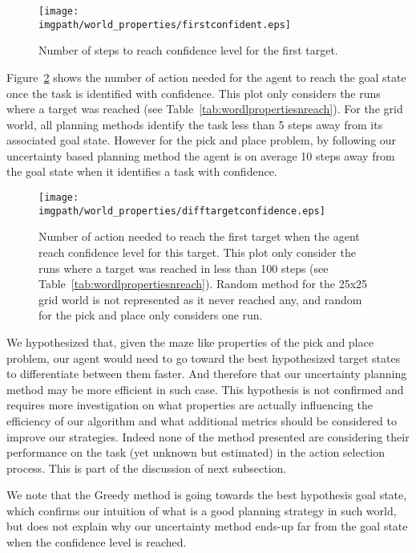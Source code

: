 \begin{figure}[!htbp]
\centering
\texttt{[image: \\imgpath/world\_properties/firstconfident.eps]}
\caption{Number of steps to reach confidence level for the first target.}
\label{fig:wordlpropertiesconfidencefirst}
\end{figure} 

Figure~\ref{fig:wordlpropertiestargetdist} shows the number of action needed for the agent to reach the goal state once the task is identified with confidence. This plot only considers the runs where a target was reached (see Table~\ref{tab:wordlpropertiesnreach}). For the grid world, all planning methods identify the task less than 5 steps away from its associated goal state. However for the pick and place problem, by following our uncertainty based planning method the agent is on average 10 steps away from the goal state when it identifies a task with confidence.

\begin{figure}[!htbp]
\centering
\texttt{[image: \\imgpath/world\_properties/difftargetconfidence.eps]}
\caption{Number of action needed to reach the first target when the agent reach confidence level for this target. This plot only consider the runs where a target was reached in less than 100 steps (see Table~\ref{tab:wordlpropertiesnreach}). Random method for the 25x25 grid world is not represented as it never reached any, and random for the pick and place only considers one run.}
\label{fig:wordlpropertiestargetdist}
\end{figure} 

We hypothesized that, given the maze like properties of the pick and place problem, our agent would need to go toward the best hypothesized target states to differentiate between them faster. And therefore that our uncertainty planning method may be more efficient in such case. This hypothesis is not confirmed and requires more investigation on what properties are actually influencing the efficiency of our algorithm and what additional metrics should be considered to improve our strategies. Indeed none of the method presented are considering their performance on the task (yet unknown but estimated) in the action selection process. This is part of the discussion of next subsection.

We note that the Greedy method is going towards the best hypothesis goal state, which confirms our intuition of what is a good planning strategy in such world, but does not explain why our uncertainty method ends-up far from the goal state when the confidence level is reached.

